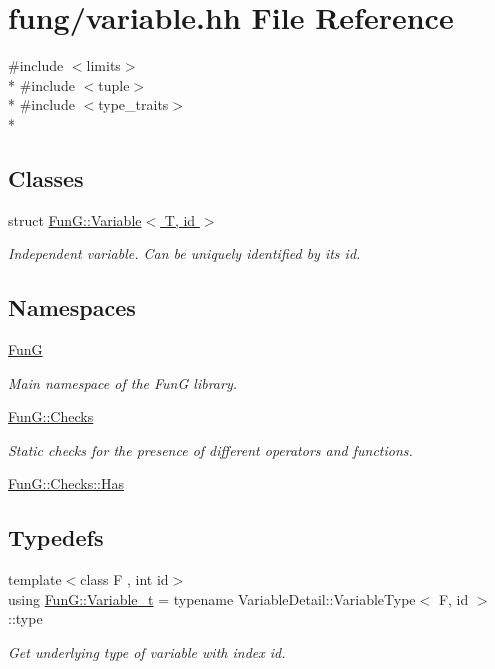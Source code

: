 \hypertarget{variable_8hh}{\section{fung/variable.hh File Reference}
\label{variable_8hh}
}
{\ttfamily \#include $<$limits$>$}\\*
{\ttfamily \#include $<$tuple$>$}\\*
{\ttfamily \#include $<$type\-\_\-traits$>$}\\*
\subsection*{Classes}
\begin{DoxyCompactItemize}
\item 
struct \hyperlink{structFunG_1_1Variable}{Fun\-G\-::\-Variable$<$ T, id $>$}
\begin{DoxyCompactList}\small\item\em Independent variable. Can be uniquely identified by its id. \end{DoxyCompactList}\end{DoxyCompactItemize}
\subsection*{Namespaces}
\begin{DoxyCompactItemize}
\item 
\hyperlink{namespaceFunG}{Fun\-G}
\begin{DoxyCompactList}\small\item\em Main namespace of the Fun\-G library. \end{DoxyCompactList}\item 
\hyperlink{namespaceFunG_1_1Checks}{Fun\-G\-::\-Checks}
\begin{DoxyCompactList}\small\item\em Static checks for the presence of different operators and functions. \end{DoxyCompactList}\item 
\hyperlink{namespaceFunG_1_1Checks_1_1Has}{Fun\-G\-::\-Checks\-::\-Has}
\end{DoxyCompactItemize}
\subsection*{Typedefs}
\begin{DoxyCompactItemize}
\item 
{\footnotesize template$<$class F , int id$>$ }\\using \hyperlink{namespaceFunG_a3d589ef7d011a46a72847eabcbbb4532}{Fun\-G\-::\-Variable\-\_\-t} = typename Variable\-Detail\-::\-Variable\-Type$<$ F, id $>$\-::type
\begin{DoxyCompactList}\small\item\em Get underlying type of variable with index id. \end{DoxyCompactList}\end{DoxyCompactItemize}

